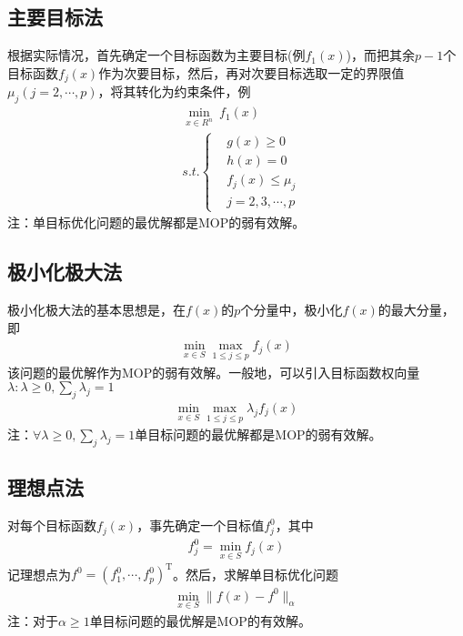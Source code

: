     \subsection{主要目标法}
        \par
        根据实际情况，首先确定一个目标函数为主要目标(例$f_1(x)$)，而把其余$p-1$个目标函数$f_j(x)$作为次要目标，然后，再对次要目标选取一定的界限值${\mu}_j(j=2,\cdots,p)$，将其转化为约束条件，例
        \begin{align*}
          & \mathop{\min}\limits_{x\in R^n}\  f_1(x)\\
          & s.t.\left\{
            \begin{aligned}
          & g(x)\geqslant 0\\
          & h(x)=0\\
          & f_j(x)\leqslant {\mu}_j\\
          & j=2,3,\cdots,p
            \end{aligned}
             \right.
        \end{align*}
        注：单目标优化问题的最优解都是MOP的弱有效解。
    \subsection{极小化极大法}
        \par
        极小化极大法的基本思想是，在$f(x)$的$p$个分量中，极小化$f(x)$的最大分量，即
        \begin{align*}
           \mathop{\min}\limits_{x\in S} \mathop{\max}\limits_{1\leqslant j \leqslant p} f_j(x)
        \end{align*}
        该问题的最优解作为MOP的弱有效解。一般地，可以引入目标函数权向量$\lambda :\lambda \geqslant 0,\mathop{\sum}_{j}{\lambda}_j=1$
        \begin{align*}
           \mathop{\min}\limits_{x\in S} \mathop{\max}\limits_{1\leqslant j \leqslant p} {\lambda}_jf_j(x)
        \end{align*}
        注：$\forall \lambda \geqslant 0,\mathop{\sum}\limits_{j} {\lambda}_j=1$单目标问题的最优解都是MOP的弱有效解。
    \subsection{理想点法}
        \par
        对每个目标函数$f_j(x)$，事先确定一个目标值$f_j^0$，其中
        \begin{align*}
           f_j^0=\mathop{\min}\limits_{x\in S} f_j(x)
        \end{align*}
        记理想点为$f^0=(f_1^0,\cdots,f_p^0)^\mathrm{T} $。然后，求解单目标优化问题
        \begin{align*}
           \mathop{\min}\limits_{x\in S} \|f(x)-f^0\|_{\alpha}
        \end{align*}
        注：对于$\alpha \geqslant 1$单目标问题的最优解是MOP的有效解。
